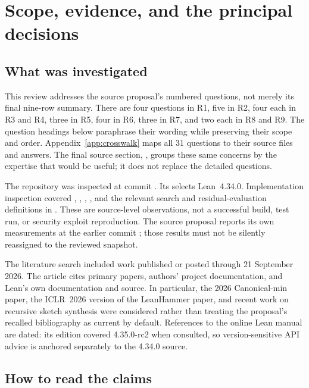 \section{Scope, evidence, and the principal decisions}\label{sec:scope}

\subsection{What was investigated}

This review addresses the source proposal's numbered questions, not merely its final nine-row summary. There are four questions in R1, five in R2, four each in R3 and R4, three in R5, four in R6, three in R7, and two each in R8 and R9. The question headings below paraphrase their wording while preserving their scope and order. Appendix~\ref{app:crosswalk} maps all 31 questions to their source files and answers. The final source section, , groups these same concerns by the expertise that would be useful; it does not replace the detailed questions.\cite{proposal}

The repository was inspected at commit . Its  selects Lean~4.34.0. Implementation inspection covered , , , , and the relevant search and residual-evaluation definitions in . These are source-level observations, not a successful build, test run, or security exploit reproduction. The source proposal reports its own measurements at the earlier commit ; those results must not be silently reassigned to the reviewed snapshot.\cite{repo,implementation}

The literature search included work published or posted through 21 September 2026. The article cites primary papers, authors' project documentation, and Lean's own documentation and source. In particular, the 2026 Canonical-min paper, the ICLR~2026 version of the LeanHammer paper, and recent work on recursive sketch synthesis were considered rather than treating the proposal's recalled bibliography as current by default.\cite{canonicalmin,leanhammer,cataclyst} References to the online Lean manual are dated: its  edition covered 4.35.0-rc2 when consulted, so version-sensitive API advice is anchored separately to the 4.34.0 source.\cite{leanmanual,leaninduction}

\subsection{How to read the claims}

